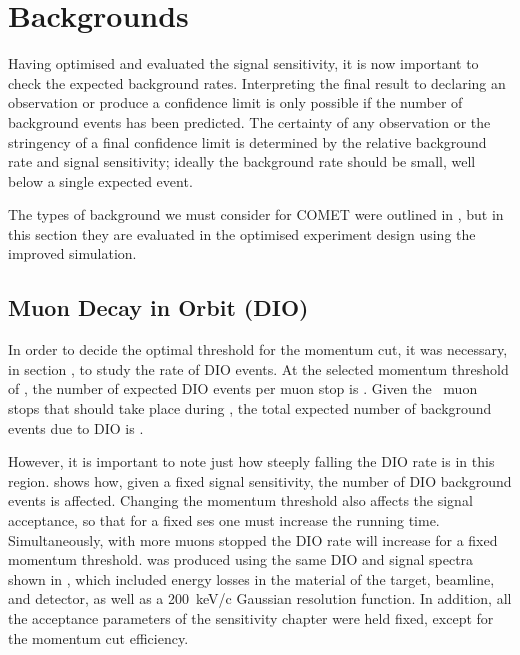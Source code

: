 
\chapter{\phaseII Backgrounds}
Having optimised and evaluated the signal sensitivity, it is now important to check the expected background rates.
Interpreting the final result to declaring an observation or produce a confidence limit is only possible if the number of background events has been predicted.
The certainty of any observation or the stringency of a final confidence limit is determined by the relative background rate and signal sensitivity; ideally the background rate should be small, well below a single expected event.

The types of background we must consider for COMET were outlined in , but in this section they are evaluated in the optimised experiment design using the improved simulation.

\FigDIOBackground
\section{Muon Decay in Orbit (\acs{DIO})}
In order to decide the optimal threshold for the momentum cut, it was necessary, in section , to study the rate of \ac{DIO} events.
At the selected momentum threshold of \VarMomThreshold, the number of expected DIO events per muon stop is \VarDIOPerMuStop{}.
Given the \VarTotalMuStops~muon stops that should take place during \phaseII, the total expected number of background events due to DIO is \VarDIOTotal.

However, it is important to note just how steeply falling the DIO rate is in this region.
 shows how, given a fixed signal sensitivity, the number of DIO background events is affected.
Changing the momentum threshold also affects the signal acceptance, so that for a fixed \ac{ses} one must increase the running time.
Simultaneously, with more muons stopped the \ac{DIO} rate will increase for a fixed momentum threshold.
 was produced using the same DIO and signal spectra shown in , which included energy losses in the material of the target, beamline, and detector, as well as a 200~keV/c Gaussian resolution function. 
In addition, all the acceptance parameters of the sensitivity chapter were held fixed, except for the momentum cut efficiency.

